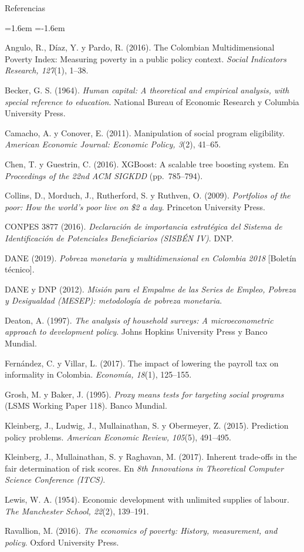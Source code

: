 \documentclass[aspectratio=169,10pt]{beamer}
\begin{document}
\begin{frame}{Referencias}
\tiny
\begin{list}{}{\leftmargin=1.6em \itemindent=-1.6em \itemsep=1.5pt \parsep=0pt}
  \item Angulo, R., Díaz, Y. y Pardo, R. (2016). The Colombian
    Multidimensional Poverty Index: Measuring poverty in a public policy
    context. \emph{Social Indicators Research, 127}(1), 1--38.
  \item Becker, G. S. (1964). \emph{Human capital: A theoretical and
    empirical analysis, with special reference to education}. National
    Bureau of Economic Research y Columbia University Press.
  \item Camacho, A. y Conover, E. (2011). Manipulation of social program
    eligibility. \emph{American Economic Journal: Economic Policy, 3}(2),
    41--65.
  \item Chen, T. y Guestrin, C. (2016). XGBoost: A scalable tree boosting
    system. En \emph{Proceedings of the 22nd ACM SIGKDD} (pp.\ 785--794).
  \item Collins, D., Morduch, J., Rutherford, S. y Ruthven, O. (2009).
    \emph{Portfolios of the poor: How the world's poor live on \$2 a day}.
    Princeton University Press.
  \item CONPES 3877 (2016). \emph{Declaración de importancia estratégica del
    Sistema de Identificación de Potenciales Beneficiarios (SISBÉN IV)}. DNP.
  \item DANE (2019). \emph{Pobreza monetaria y multidimensional en Colombia
    2018} [Boletín técnico].
  \item DANE y DNP (2012). \emph{Misión para el Empalme de las Series de
    Empleo, Pobreza y Desigualdad (MESEP): metodología de pobreza monetaria}.
  \item Deaton, A. (1997). \emph{The analysis of household surveys: A
    microeconometric approach to development policy}. Johns Hopkins
    University Press y Banco Mundial.
  \item Fernández, C. y Villar, L. (2017). The impact of lowering the payroll
    tax on informality in Colombia. \emph{Economía, 18}(1), 125--155.
  \item Grosh, M. y Baker, J. (1995). \emph{Proxy means tests for targeting
    social programs} (LSMS Working Paper 118). Banco Mundial.
  \item Kleinberg, J., Ludwig, J., Mullainathan, S. y Obermeyer, Z. (2015).
    Prediction policy problems. \emph{American Economic Review, 105}(5),
    491--495.
  \item Kleinberg, J., Mullainathan, S. y Raghavan, M. (2017). Inherent
    trade-offs in the fair determination of risk scores. En \emph{8th
    Innovations in Theoretical Computer Science Conference (ITCS)}.
  \item Lewis, W. A. (1954). Economic development with unlimited supplies of
    labour. \emph{The Manchester School, 22}(2), 139--191.
  \item Ravallion, M. (2016). \emph{The economics of poverty: History,
    measurement, and policy}. Oxford University Press.
\end{list}
\end{frame}
\end{document}
